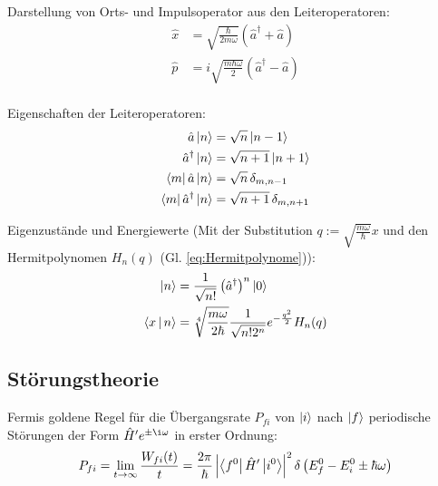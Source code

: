 \documentclass[11pt]{article}
\numberwithin{equation}{section}
\begin{document}
				\noindent
				Darstellung von Orts- und Impulsoperator aus den Leiteroperatoren:
				\begin{equation}
					\begin{aligned}
						\hat{x} &= \sqrt{\frac{\hbar}{2m\omega}}\left(\hat{a}^\dagger + \hat{a} \right) \\
						\hat{p} &= i\sqrt{\frac{m\hbar\omega}{2}}\left(\hat{a}^\dagger - \hat{a} \right) \\
					\end{aligned}
				\end{equation}

				\noindent
				Eigenschaften der Leiteroperatoren:
				\begin{equation}
					\begin{aligned}
						\hat{a}\Ket{n} &= \sqrt{n}\Ket{n-1} \\
						\hat{a}^\dagger\Ket{n} &= \sqrt{n+1}\Ket{n+1} \\
						\Bra{m}\hat{a}\Ket{n} &= \sqrt{n} \,\delta_{m,n-1} \\
						\Bra{m}\hat{a}^\dagger\Ket{n} &= \sqrt{n+1} \,\delta_{m,n+1} \\
					\end{aligned}
				\end{equation}

				\noindent
				Eigenzustände und Energiewerte (Mit der Substitution $q:=\sqrt{\frac{m\omega}{\hbar}}x$ und den Hermitpolynomen $H_n(q)$ (Gl. \ref{eq:Hermitpolynome})):
				\begin{equation}
					\begin{aligned}
						\Ket{n} &= \frac{1}{\sqrt{n!}}\left(\hat{a}^\dagger\right)^n\Ket{0} \\
						\Braket{x|n} &= \sqrt[4]{\frac{m\omega}{2\hbar}} \frac{1}{\sqrt{n! 2^n}} e^{-\frac{q^2}{2}} H_n(q) \\
					\end{aligned}
				\end{equation}

		\subsection{Störungstheorie}
			\noindent
			Fermis goldene Regel für die Übergangsrate $P_{fi}$ von $\Ket{i}$ nach $\Ket{f}$ periodische Störungen der Form $\hat{H}' e^{\pm\i\omega}$ in erster Ordnung:
			\begin{equation}
				P_{fi} = \lim_{t\rightarrow\infty} \frac{W_{fi}(t)}{t} = \frac{2\pi}{\hbar} \left| \Bra{f^0}\hat{H}'\Ket{i^0} \right|^2 \delta\left( E_f^0 - E_i^0 \pm \hbar\omega \right)
			\end{equation}
\end{document}

